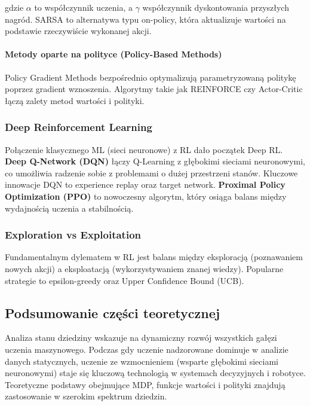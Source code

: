 \documentclass[12pt,a4paper]{article}
\begin{document}
gdzie $\alpha$ to współczynnik uczenia, a $\gamma$ współczynnik dyskontowania przyszłych nagród. SARSA to alternatywa typu on-policy, która aktualizuje wartości na podstawie rzeczywiście wykonanej akcji.

\paragraph{Metody oparte na polityce (Policy-Based Methods)}
Policy Gradient Methods bezpośrednio optymalizują parametryzowaną politykę poprzez gradient wznoszenia. Algorytmy takie jak REINFORCE czy Actor-Critic łączą zalety metod wartości i polityki.

\subsubsection{Deep Reinforcement Learning}

Połączenie klasycznego ML (sieci neuronowe) z RL dało początek Deep RL.
\textbf{Deep Q-Network (DQN)} łączy Q-Learning z głębokimi sieciami neuronowymi, co umożliwia radzenie sobie z problemami o dużej przestrzeni stanów. Kluczowe innowacje DQN to experience replay oraz target network.
\textbf{Proximal Policy Optimization (PPO)} to nowoczesny algorytm, który osiąga balans między wydajnością uczenia a stabilnością.

\subsubsection{Exploration vs Exploitation}

Fundamentalnym dylematem w RL jest balans między eksploracją (poznawaniem nowych akcji) a eksploatacją (wykorzystywaniem znanej wiedzy). Popularne strategie to epsilon-greedy oraz Upper Confidence Bound (UCB).

\subsection{Podsumowanie części teoretycznej}

Analiza stanu dziedziny wskazuje na dynamiczny rozwój wszystkich gałęzi uczenia maszynowego. Podczas gdy uczenie nadzorowane dominuje w analizie danych statycznych, uczenie ze wzmocnieniem (wsparte głębokimi sieciami neuronowymi) staje się kluczową technologią w systemach decyzyjnych i robotyce. Teoretyczne podstawy obejmujące MDP, funkcje wartości i polityki znajdują zastosowanie w szerokim spektrum dziedzin.
\end{document}
